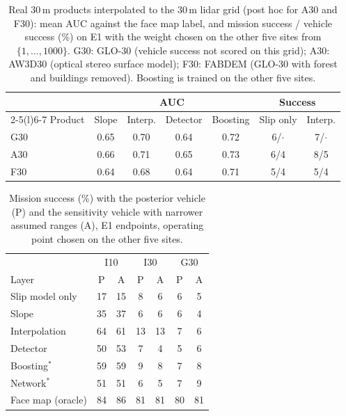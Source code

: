 \documentclass[10pt]{article}
\begin{document}
\begin{table}[H]
\caption{Real 30\,m products interpolated to the 30\,m lidar grid (post hoc for A30 and F30): mean AUC against the face map label, and mission success / vehicle success (\%) on E1 with the weight chosen on the other five sites from $\{1,\dots,1000\}$. G30: GLO-30 (vehicle success not scored on this grid); A30: AW3D30 (optical stereo surface model); F30: FABDEM (GLO-30 with forest and buildings removed). Boosting is trained on the other five sites.}
\label{tab:products}
\centering\scriptsize
\begin{tabular}{@{}lcccccc@{}}
\toprule
 & \multicolumn{4}{c}{AUC} & \multicolumn{2}{c}{Success} \\
\cmidrule(lr){2-5}\cmidrule(l){6-7}
Product & Slope & Interp. & Detector & Boosting & Slip only & Interp. \\
\midrule
G30 & 0.65 & 0.70 & 0.64 & 0.72 & 6/$\cdot$ & 7/$\cdot$ \\
A30 & 0.66 & 0.71 & 0.65 & 0.73 & 6/4 & 8/5 \\
F30 & 0.64 & 0.68 & 0.64 & 0.71 & 5/4 & 5/4 \\
\bottomrule
\end{tabular}
\end{table}

\begin{table}[H]
\caption{Mission success (\%) with the posterior vehicle (P) and the sensitivity vehicle with narrower assumed ranges (A), E1 endpoints, operating point chosen on the other five sites.}
\label{tab:sensitivity}
\centering\scriptsize
\begin{tabular}{@{}lcccccc@{}}
\toprule
 & \multicolumn{2}{c}{I10} & \multicolumn{2}{c}{I30} & \multicolumn{2}{c}{G30} \\
Layer & P & A & P & A & P & A \\
\midrule
Slip model only & 17 & 15 & 8 & 6 & 6 & 5 \\
Slope & 35 & 37 & 6 & 6 & 6 & 4 \\
Interpolation & 64 & 61 & 13 & 13 & 7 & 6 \\
Detector & 50 & 53 & 7 & 4 & 5 & 6 \\
Boosting$^{*}$ & 59 & 59 & 9 & 8 & 7 & 8 \\
Network$^{*}$ & 51 & 51 & 6 & 5 & 7 & 9 \\
Face map (oracle) & 84 & 86 & 81 & 81 & 80 & 81 \\
\bottomrule
\end{tabular}
\end{table}
\end{document}
